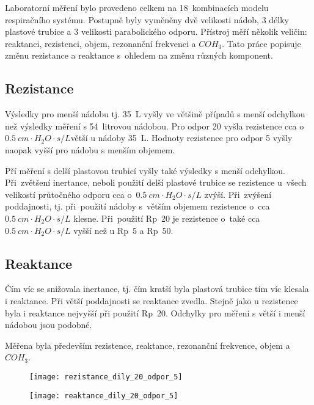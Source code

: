 \label{kap-vysledky}
Laboratorní měření bylo provedeno celkem na 18~kombinacích modelu respiračního systému. Postupně byly vyměněny dvě velikosti nádob, 3 délky plastové trubice a 3 velikosti parabolického odporu. Přístroj měří několik veličin: reaktanci, rezistenci, objem, rezonanční frekvenci a $COH_{3}$. Tato práce popisuje změnu rezistance a reaktance s~ohledem na změnu různých komponent.  

 
\subsection{Rezistance}

Výsledky pro menší nádobu tj. \SI{35}{L} vyšly ve většině případů s menší odchylkou než výsledky měření s 54~litrovou nádobou. Pro odpor 20 vyšla rezistence cca o $\SI{0,5}{cm\cdot H_{2}O \cdot s/L} $větší u nádoby \SI{35}{L}. Hodnoty rezistence pro odpor 5 vyšly naopak vyšší pro nádobu s menším objemem. 

Pří měření s delší plastovou trubicí vyšly také výsledky s menší odchylkou. 
Při~zvětšení inertance, neboli použití delší plastové trubice se rezistence u~všech velikostí průtočného odporu cca o~$\SI{0,5}{ cm\cdot H_{2}O \cdot s/L} $ zvýší. 
Při~zvýšení poddajnosti, tj. při~použití nádoby s~větším objemem rezistence o~cca  $\SI{0,5}{ cm\cdot H_{2}O \cdot s/L} $  klesne. 
Při~použití Rp~20 je rezistence o~také cca  $\SI{0,5}{ cm\cdot H_{2}O \cdot s/L} $  vyšší než u Rp~5 a Rp~50. 

\subsection{Reaktance}

Čím víc se snižovala inertance, tj. čím kratší byla plastová trubice tím víc klesala i reaktance. Při větší poddajnosti se reaktance zvedla. Stejně jako u rezistence byla i reaktance nejvyšší při použití Rp~20. Odchylky pro měření s větší i menší nádobou jsou podobné. 


Měřena byla především rezistence, reaktance, rezonanční frekvence, objem a $COH_{3}$. 



\begin{figure}
\centering
\begin{minipage}{.5\textwidth}
  \centering
  \texttt{[image: rezistance\_dily\_20\_odpor\_5]}
\captionsetup{justification=centering}
\end{minipage}%
\begin{minipage}{.5\textwidth}
  \centering
  \texttt{[image: reaktance\_dily\_20\_odpor\_5]}
\captionsetup{justification=centering}
\end{minipage}
\end{figure}


